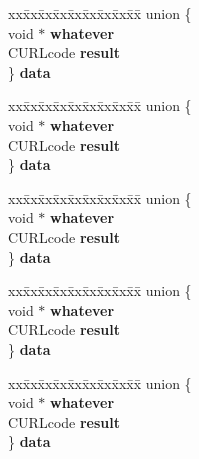 \begin{DoxyCompactItemize}
\begin{tabbing}
\end{tabbing}\item 
\mbox{\label{structCURLMsg_a6dcccf3d89f91e911098aeea19b50ed8}} 
\begin{tabbing}
xx\=xx\=xx\=xx\=xx\=xx\=xx\=xx\=xx\=\kill
union \{\\
\>void $\ast$ {\bfseries whatever}\\
\>CURLcode {\bfseries result}\\
\} {\bfseries data}\\

\end{tabbing}\item 
\mbox{\label{structCURLMsg_add7e25f9cdafb209d8506db6531f2780}} 
\begin{tabbing}
xx\=xx\=xx\=xx\=xx\=xx\=xx\=xx\=xx\=\kill
union \{\\
\>void $\ast$ {\bfseries whatever}\\
\>CURLcode {\bfseries result}\\
\} {\bfseries data}\\

\end{tabbing}\item 
\mbox{\label{structCURLMsg_a4e304ff0bb99322e2614aa221d9b3370}} 
\begin{tabbing}
xx\=xx\=xx\=xx\=xx\=xx\=xx\=xx\=xx\=\kill
union \{\\
\>void $\ast$ {\bfseries whatever}\\
\>CURLcode {\bfseries result}\\
\} {\bfseries data}\\

\end{tabbing}\item 
\mbox{\label{structCURLMsg_ae89e5c71720e739525689f5b6879fe18}} 
\begin{tabbing}
xx\=xx\=xx\=xx\=xx\=xx\=xx\=xx\=xx\=\kill
union \{\\
\>void $\ast$ {\bfseries whatever}\\
\>CURLcode {\bfseries result}\\
\} {\bfseries data}\\

\end{tabbing}\item 
\mbox{\label{structCURLMsg_a864c4b9333985338d4ff5743b6539b58}} 
\begin{tabbing}
xx\=xx\=xx\=xx\=xx\=xx\=xx\=xx\=xx\=\kill
union \{\\
\>void $\ast$ {\bfseries whatever}\\
\>CURLcode {\bfseries result}\\
\} {\bfseries data}\\

\end{tabbing}\end{DoxyCompactItemize}


